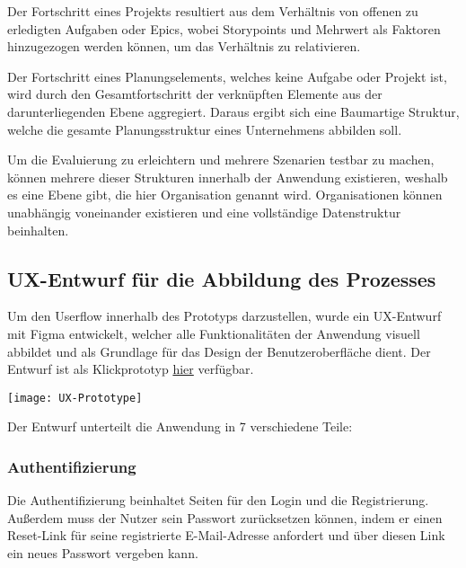 Der Fortschritt eines Projekts resultiert aus dem Verhältnis von offenen zu erledigten Aufgaben oder Epics, wobei Storypoints und Mehrwert als Faktoren hinzugezogen werden können, um das Verhältnis zu relativieren.

Der Fortschritt eines Planungselements, welches keine Aufgabe oder Projekt ist, wird durch den Gesamtfortschritt der verknüpften Elemente aus der darunterliegenden Ebene aggregiert. Daraus ergibt sich eine Baumartige Struktur, welche die gesamte Planungsstruktur eines Unternehmens abbilden soll.

Um die Evaluierung zu erleichtern und mehrere Szenarien testbar zu machen, können mehrere dieser Strukturen innerhalb der Anwendung existieren, weshalb es eine Ebene gibt, die hier Organisation genannt wird. Organisationen können unabhängig voneinander existieren und eine vollständige Datenstruktur beinhalten.

\subsection{UX-Entwurf für die Abbildung des Prozesses}
Um den Userflow innerhalb des Prototyps darzustellen, wurde ein UX-Entwurf mit Figma entwickelt, welcher alle Funktionalitäten der Anwendung visuell abbildet und als Grundlage für das Design der Benutzeroberfläche dient. Der Entwurf ist als Klickprototyp \href{https://www.figma.com/proto/6TjaUCKvs4DjwzTDEiWxiO/Prototype?type=design&node-id=0-1&scaling=min-zoom&starting-point-node-id=2%3A61}{hier} verfügbar.

\vspace{20pt}
\begin{center}
    \begin{minipage}{\linewidth}
        \texttt{[image: UX-Prototype]}
    \end{minipage}
\end{center}
\vspace{20pt}


Der Entwurf unterteilt die Anwendung in 7 verschiedene Teile:

\subsubsection{Authentifizierung}
Die Authentifizierung beinhaltet Seiten für den Login und die Registrierung. Außerdem muss der Nutzer sein Passwort zurücksetzen können, indem er einen Reset-Link für seine registrierte E-Mail-Adresse anfordert und über diesen Link ein neues Passwort vergeben kann.


